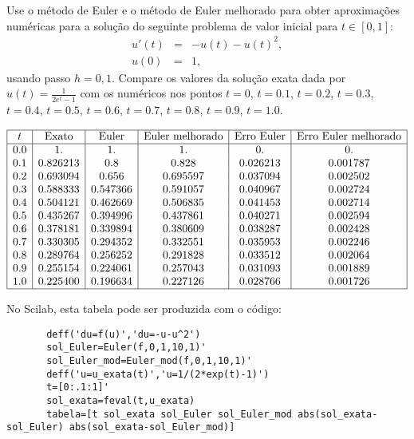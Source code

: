 \begin{exer}
Use o método de Euler e o método de Euler melhorado para obter aproximações numéricas para a solução do seguinte problema de valor inicial para $t\in[0,1]$:
\begin{eqnarray*}
 u'(t)&=&-u(t)- u(t)^2,\\
 u(0)&=&1,
\end{eqnarray*}
usando passo $h=0,1$. Compare os valores da solução exata dada por $u(t)=\frac{1}{2e^t-1}$ com os numéricos nos pontos $t=0$, $t=0.1$, $t=0.2$, $t=0.3$, $t=0.4$, $t=0.5$, $t=0.6$, $t=0.7$, $t=0.8$, $t=0.9$, $t=1.0$.
\end{exer}
\begin{resp}
 $$\begin{array}{|c|c|c|c|c|c|}
\hline
t &  \text{Exato} & \text{Euler} & \text{Euler melhorado} & \text{Erro Euler} & \text{Erro Euler melhorado}\\
\hline
0.0&    1.          &1.          &1.          &0.          &0.       \\
0.1&    0.826213    &0.8         &0.828       &0.026213    &0.001787\\
0.2&    0.693094    &0.656       &0.695597    &0.037094    &0.002502  \\
0.3&    0.588333    &0.547366    &0.591057    &0.040967    &0.002724  \\
0.4&    0.504121    &0.462669    &0.506835    &0.041453    &0.002714  \\
0.5&    0.435267    &0.394996    &0.437861    &0.040271    &0.002594  \\
0.6&    0.378181    &0.339894    &0.380609    &0.038287    &0.002428  \\
0.7&    0.330305    &0.294352    &0.332551    &0.035953    &0.002246  \\
0.8&    0.289764    &0.256252    &0.291828    &0.033512    &0.002064  \\
0.9&    0.255154    &0.224061    &0.257043    &0.031093    &0.001889  \\
1.0&    0.225400    &0.196634    &0.227126    &0.028766    &0.001726\\

\hline
\end{array}
$$

\ifisscilab
      No Scilab, esta tabela pode ser produzida com o código:
      \begin{verbatim}
       deff('du=f(u)','du=-u-u^2')
       sol_Euler=Euler(f,0,1,10,1)'
       sol_Euler_mod=Euler_mod(f,0,1,10,1)'
       deff('u=u_exata(t)','u=1/(2*exp(t)-1)')
       t=[0:.1:1]'
       sol_exata=feval(t,u_exata)
       tabela=[t sol_exata sol_Euler sol_Euler_mod abs(sol_exata-sol_Euler) abs(sol_exata-sol_Euler_mod)]
      \end{verbatim}

    \fi
\end{resp}


